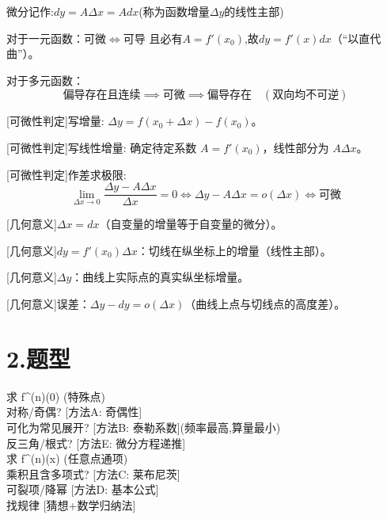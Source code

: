 \documentclass[11pt,a4paper,UTF8]{ctexart}
\begin{document}
微分记作:$dy = A \Delta x = A dx$(称为函数增量$\Delta y$的线性主部)

对于一元函数：可微$\Leftrightarrow$可导	     且必有$A = f'(x_0)$,故$dy = f'(x) dx$（“以直代曲”）。

对于多元函数：
\begin{equation*}
\text{偏导存在且连续} \implies \text{可微} \implies \text{偏导存在} \quad (\text{双向均不可逆})
\end{equation*}


[可微性判定]写增量:	   $\Delta y = f(x_0 + \Delta x) - f(x_0)$。

[可微性判定]写线性增量:	确定待定系数 $A = f'(x_0)$，线性部分为 $A \Delta x$。

[可微性判定]作差求极限:	
\begin{equation*}
\lim_{\Delta x \to 0} \frac{\Delta y - A \Delta x}{\Delta x} = 0 \iff \Delta y - A \Delta x = o(\Delta x) \iff \text{可微}
\end{equation*}


[几何意义]$\Delta x = dx$（自变量的增量等于自变量的微分）。

[几何意义]$dy = f'(x_0) \Delta x$：切线在纵坐标上的增量（线性主部）。

[几何意义]$\Delta y$：曲线上实际点的真实纵坐标增量。

[几何意义]误差：$\Delta y - dy = o(\Delta x)$（曲线上点与切线点的高度差）。


\section{2.题型}

\begin{thmbox}[题型(1):求高阶导数]

\end{thmbox}

\begin{tcolorbox}[colback=LightPurpleBg,colframe=TitlePurple!60,arc=2pt,boxrule=0.8pt]
求 f\textasciicircum{}(n)(0) (特殊点)\\[1mm]
对称/奇偶? 				[方法A: 奇偶性]\\[1mm]
可化为常见展开? 	 	  [方法B: 泰勒系数](频率最高,算量最小)\\[1mm]
反三角/根式? 	    	[方法E: 微分方程递推]\\[1mm]
求 f\textasciicircum{}(n)(x) (任意点通项)\\[1mm]
乘积且含多项式?	 	[方法C: 莱布尼茨]\\[1mm]
可裂项/降幂		 	  [方法D: 基本公式]\\[1mm]
找规律				 	[猜想+数学归纳法]\\[1mm]
\vspace{1mm}
\end{tcolorbox}
\end{document}
